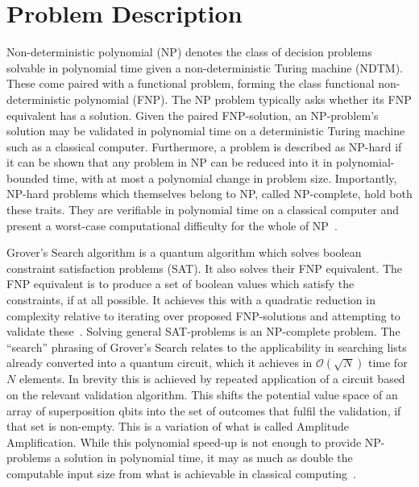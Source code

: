 \documentclass[msc,lith,english]{liuthesis}
\author{\parbox{\textwidth}{Emil Segerbäck\\ Olav Övrebö}}
\begin{document}
\chapter{Problem Description}
Non-deterministic polynomial (NP) denotes the class of decision problems solvable in polynomial time given a non-deterministic Turing machine (NDTM). These come paired with a functional problem, forming the class functional non-deterministic polynomial (FNP). The NP problem typically asks whether its FNP equivalent has a solution. Given the paired FNP-solution, an NP-problem's solution may be validated in polynomial time on a deterministic Turing machine such as a classical computer. Furthermore, a problem is described as NP-hard if it can be shown that any problem in NP can be reduced into it in polynomial-bounded time, with at most a polynomial change in problem size. Importantly, NP-hard problems which themselves belong to NP, called NP-complete, hold both these traits. They are verifiable in polynomial time on a classical computer and present a worst-case computational difficulty for the whole of NP~\cite{CCAMA}.

Grover’s Search algorithm is a quantum algorithm which solves boolean constraint satisfaction problems (SAT). It also solves their FNP equivalent. The FNP equivalent is to produce a set of boolean values which satisfy the constraints, if at all possible. It achieves this with a quadratic reduction in complexity relative to iterating over proposed FNP-solutions and attempting to validate these~\cite{QCQI, CCAMA}. Solving general SAT-problems is an NP-complete problem. The “search” phrasing of Grover's Search relates to the applicability in searching lists already converted into a quantum circuit, which it achieves in $\mathcal{O}(\sqrt{N})$ time for $N$ elements. In brevity this is achieved by repeated application of a circuit based on the relevant validation algorithm. This shifts the potential value space of an array of superposition qbits into the set of outcomes that fulfil the validation, if that set is non-empty. This is a variation of what is called Amplitude Amplification. While this polynomial speed-up is not enough to provide NP-problems a solution in polynomial time, it may as much as double the computable input size from what is achievable in classical computing~\cite{EIQC}.
\end{document}

